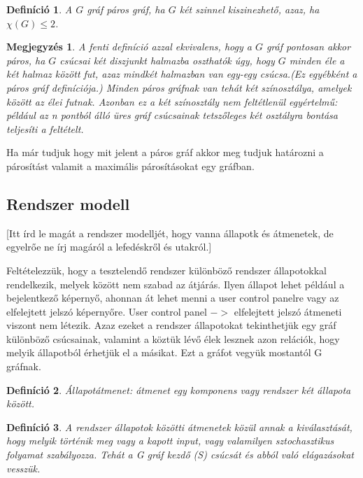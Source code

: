 \documentclass[12pt]{article}
\newtheorem{defin}{Definíció}[section]
\newtheorem{megj}{Megjegyzés}[section]
\begin{document}
\begin{defin}
A $G$ gráf páros gráf, ha $G$ két szinnel kiszinezhető, azaz, ha $\chi(G) \leq 2$. ~\cite{szam:Fleiner}
\end{defin}

\begin{megj}
A fenti definíció azzal ekvivalens, hogy a $G$ gráf pontosan akkor páros, ha $G$ csúcsai két diszjunkt halmazba oszthatók úgy, hogy $G$ minden éle a két halmaz között fut, azaz mindkét halmazban van egy-egy csúcsa.(Ez egyébként a páros gráf definíciója.) Minden páros gráfnak van tehát két színosztálya, amelyek között az élei futnak. Azonban ez a két színosztály nem feltétlenül egyértelmű: például az n pontból álló üres gráf csúcsainak tetszőleges két osztályra bontása teljesíti a feltételt.
\end{megj}

Ha már tudjuk hogy mit jelent a páros gráf akkor meg tudjuk határozni a párosítást valamit a maximális párosításokat egy gráfban.

\subsection{Rendszer modell}
[Itt írd le magát a rendszer modelljét, hogy vanna állapotk és átmenetek, de egyelrőe ne írj magáról a lefedéskről és utakról.]

Feltételezzük, hogy a tesztelendő rendszer különböző rendszer állapotokkal rendelkezik, melyek között nem szabad az átjárás. Ilyen állapot lehet például a bejelentkező képernyő, ahonnan át lehet menni a user control panelre vagy az elfelejtett jelszó képernyőre. User control panel $->$ elfelejtett jelszó átmeneti viszont nem létezik. Azaz ezeket a rendszer állapotokat tekinthetjük egy gráf különböző csúcsainak, valamint a köztük lévő élek lesznek azon relációk, hogy melyik állapotból érhetjük el a másikat. Ezt a gráfot vegyük mostantól G gráfnak.


\begin{defin}
Állapotátmenet: átmenet egy komponens vagy rendszer két állapota között. ~\cite{htb:masterfield}
\end{defin}

\begin{defin}
A rendszer állapotok közötti átmenetek közül annak a kiválasztását, hogy melyik történik meg vagy a kapott input, vagy valamilyen sztochasztikus folyamat szabályozza. Tehát a G gráf kezdő (S) csúcsát és abból való elágazásokat vesszük.
\end{defin}
\end{document}
